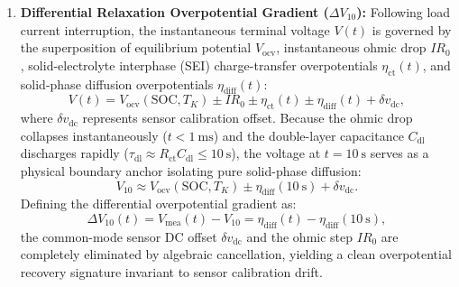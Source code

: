 \begin{enumerate}
	\item \textbf{Differential Relaxation Overpotential Gradient ($\Delta V_{10}$):}
	Following load current interruption, the instantaneous terminal voltage $V(t)$ is governed by the superposition of equilibrium potential $V_{\text{ocv}}$, instantaneous ohmic drop $I R_0$, solid-electrolyte interphase (SEI) charge-transfer overpotentials $\eta_{\text{ct}}(t)$, and solid-phase diffusion overpotentials $\eta_{\text{diff}}(t)$:
	\begin{equation}
		\label{eq:voltage_decomposition}
		V(t) = V_{\text{ocv}}(\text{SOC}, T_K) \pm I R_0 \pm \eta_{\text{ct}}(t) \pm \eta_{\text{diff}}(t) + \delta v_{\text{dc}},
	\end{equation}
	where $\delta v_{\text{dc}}$ represents sensor calibration offset. Because the ohmic drop collapses instantaneously ($t < 1\ \text{ms}$) and the double-layer capacitance $C_{\text{dl}}$ discharges rapidly ($\tau_{\text{dl}} \approx R_{\text{ct}} C_{\text{dl}} \le 10\ \text{s}$), the voltage at $t = 10\ \text{s}$ serves as a physical boundary anchor isolating pure solid-phase diffusion:
	\begin{equation}
		\label{eq:v10_anchor}
		V_{10} \approx V_{\text{ocv}}(\text{SOC}, T_K) \pm \eta_{\text{diff}}(10\ \text{s}) + \delta v_{\text{dc}}.
	\end{equation}
	Defining the differential overpotential gradient as:
	\begin{equation}
		\label{eq:delta_v10}
		\Delta V_{10}(t) = V_{\text{mea}}(t) - V_{10} = \eta_{\text{diff}}(t) - \eta_{\text{diff}}(10\ \text{s}),
	\end{equation}
	the common-mode sensor DC offset $\delta v_{\text{dc}}$ and the ohmic step $I R_0$ are completely eliminated by algebraic cancellation, yielding a clean overpotential recovery signature invariant to sensor calibration drift.
	

\end{enumerate}
